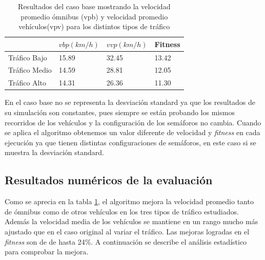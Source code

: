  \begin{table}[H]
 	\renewcommand{\arraystretch}{1.2}
 	\caption{Resultados del caso base mostrando la velocidad promedio ómnibus (vpb) y velocidad promedio vehículos(vpv) para los distintos tipos de tráfico}
 	\label{table:resultado_caso_base}
 	\centering
 	\begin{tabular}{p{2.5cm}p{2.5cm}p{2.5cm}p{2cm} }
 		\hline
 		&
 		$vbp(km/h)$& 
 		$vvp(km/h)$ & 
 		Fitness \\ 
 		\hline
 		Tráfico Bajo & 15.89  & 32.45& 13.42\\
 		Tráfico Medio & 14.59  & 28.81& 12.05\\
 		Tráfico Alto & 14.31  & 26.36& 11.30\\

 		\hline
 	\end{tabular}
 \end{table}
 
 En el caso base no se representa la desviación standard ya que los resultados de su simulación son constantes, pues siempre se están probando los mismos recorridos de los vehículos y la configuración de los semáforos no cambia. Cuando se aplica el algoritmo obtenemos un valor diferente de velocidad y \emph{fitness} en cada ejecución ya que tienen distintas configuraciones de semáforos, en este caso si se muestra la desviación standard.


\subsection{Resultados numéricos de la evaluación }

Como se aprecia en la tabla \ref{table:resultado_caso_base}, el algoritmo mejora la velocidad promedio tanto de ómnibus como de otros vehículos en los tres tipos de tráfico estudiados. Además la velocidad media de los vehículos se mantiene en un rango mucho más ajustado que en el caso original al variar el tráfico. Las mejoras logradas en el \emph{fitness} son de de hasta 24\%. A continuación se describe el análisis estadístico para comprobar la mejora.


